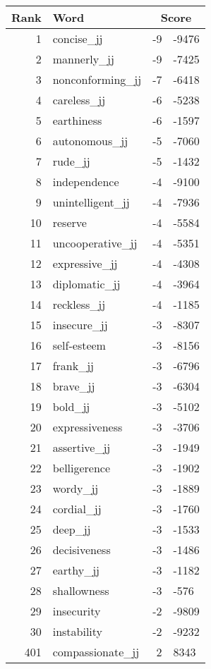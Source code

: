 \begin{longtable}[!htbp]{| rlr@{.}l |}
    \hline
    \textbf{Rank} & \textbf{Word} & \multicolumn{2}{c|}{\textbf{Score}} \\
    \hline
    \endhead
    1 & concise\_jj & -9 & -9476 \\
    2 & mannerly\_jj & -9 & -7425 \\
    3 & nonconforming\_jj & -7 & -6418 \\
    4 & careless\_jj & -6 & -5238 \\
    5 & earthiness & -6 & -1597 \\
    6 & autonomous\_jj & -5 & -7060 \\
    7 & rude\_jj & -5 & -1432 \\
    8 & independence & -4 & -9100 \\
    9 & unintelligent\_jj & -4 & -7936 \\
    10 & reserve & -4 & -5584 \\
    11 & uncooperative\_jj & -4 & -5351 \\
    12 & expressive\_jj & -4 & -4308 \\
    13 & diplomatic\_jj & -4 & -3964 \\
    14 & reckless\_jj & -4 & -1185 \\
    15 & insecure\_jj & -3 & -8307 \\
    16 & self-esteem & -3 & -8156 \\
    17 & frank\_jj & -3 & -6796 \\
    18 & brave\_jj & -3 & -6304 \\
    19 & bold\_jj & -3 & -5102 \\
    20 & expressiveness & -3 & -3706 \\
    21 & assertive\_jj & -3 & -1949 \\
    22 & belligerence & -3 & -1902 \\
    23 & wordy\_jj & -3 & -1889 \\
    24 & cordial\_jj & -3 & -1760 \\
    25 & deep\_jj & -3 & -1533 \\
    26 & decisiveness & -3 & -1486 \\
    27 & earthy\_jj & -3 & -1182 \\
    28 & shallowness & -3 & -576 \\
    29 & insecurity & -2 & -9809 \\
    30 & instability & -2 & -9232 \\
    401 & compassionate\_jj & 2 & 8343 \\

\end{longtable}
